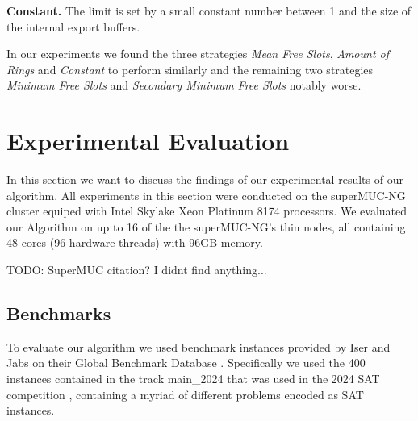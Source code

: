 \documentclass[12pt,a4paper,twoside]{scrartcl}
\numberwithin{equation}{section}
\begin{document}
\textbf{Constant.} The limit is set by a small constant number between 1 and the size of the internal export buffers.

In our experiments we found the three strategies \textit{Mean Free Slots}, \textit{Amount of Rings} and \textit{Constant} to perform similarly and the remaining two strategies \textit{Minimum Free Slots} and \textit{Secondary Minimum Free Slots} notably worse.


\newpage
\section{Experimental Evaluation}

In this section we want to discuss the findings of our experimental results of our algorithm. All experiments in this section were conducted on the superMUC-NG cluster equiped with Intel Skylake Xeon Platinum 8174 processors. We evaluated our Algorithm on up to 16 of the the superMUC-NG's thin nodes, all containing 48 cores (96 hardware threads) with 96GB memory.

TODO: SuperMUC citation? I didnt find anything...

\subsection{Benchmarks}
To evaluate our algorithm we used benchmark instances provided by Iser and Jabs on their Global Benchmark Database \cite{benchmarkDB}. Specifically we used the 400 instances contained in the track main\_2024 that was used in the 2024 SAT competition \cite{satComp2024}, containing a myriad of different problems encoded as SAT instances.
\end{document}
